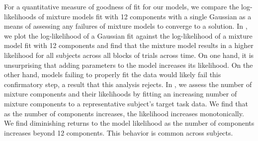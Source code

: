 \documentclass[../main.tex]{subfiles}
\begin{document}





For a quantitative measure of goodness of fit for our models, we compare the log-likelihoods of mixture models fit with 12 components with a single Gaussian as a means of assessing any failures of mixture models to converge to a solution. In , we plot the log-likelihood of a Gaussian fit against the log-likelihood of a mixture model fit with 12 components and find that the mixture model results in a higher likelihood for all subjects across all blocks of trials across time. On one hand, it is unsurprising that adding parameters to the model increases its likelihood. On the other hand, models failing to properly fit the data would likely fail this confirmatory step, a result that this analysis rejects. In , we assess the number of mixture components and their likelihoods by fitting an increasing number of mixture components to a representative subject's target task data. We find that as the number of components increases, the likelihood increases monotonically. We find diminishing returns to the model likelihood as the number of components increases beyond 12 components. This behavior is common across subjects.
\end{document}
